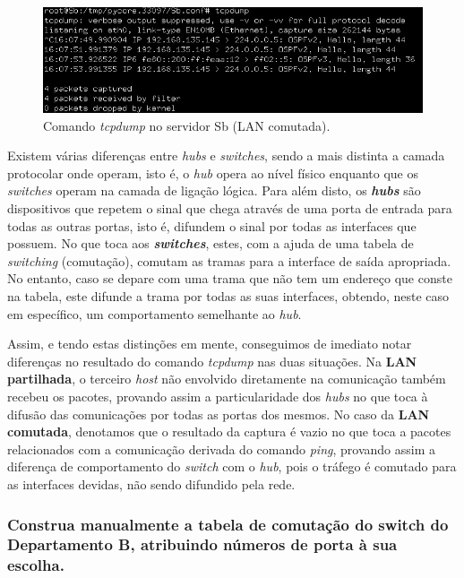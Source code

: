     \begin{figure}[H]
    \centering
    \includegraphics[width=400pt]{prints/Questao5/B-Sb.jpg}
    \caption{Comando \textit{tcpdump} no servidor Sb (LAN comutada).} \label{questao5-tcpdump-B}
    \end{figure}
    
    
    
    \par Existem várias diferenças entre \textit{hubs} e \textit{switches}, sendo a mais distinta a camada protocolar onde operam, isto é, o \textit{hub} opera ao nível físico enquanto que os \textit{switches} operam na camada de ligação lógica.
    Para além disto, os \textit{\textbf{hubs}} são dispositivos que repetem o sinal que chega através de uma porta de entrada para todas as outras portas, isto é, difundem o sinal por todas as interfaces que possuem.
    No que toca aos \textit{\textbf{switches}}, estes, com a ajuda de uma tabela de \textit{switching} (comutação), comutam as tramas para a interface de saída apropriada. No entanto, caso se depare com uma trama que não tem um endereço que conste na tabela, este difunde a trama por todas as suas interfaces, obtendo, neste caso em específico, um comportamento semelhante ao \textit{hub}.

    \par Assim, e tendo estas distinções em mente, conseguimos de imediato notar diferenças no resultado do comando \textit{tcpdump} nas duas situações. Na \textbf{LAN partilhada}, o terceiro \textit{host} não envolvido diretamente na comunicação também recebeu os pacotes, provando assim a particularidade dos \textit{hubs} no que toca à difusão das comunicações por todas as portas dos mesmos.
    No caso da \textbf{LAN comutada}, denotamos que o resultado da captura é vazio no que toca a pacotes relacionados com a comunicação derivada do comando \textit{ping}, provando assim a diferença de comportamento do \textit{switch} com o \textit{hub}, pois o tráfego é comutado para as interfaces devidas, não sendo difundido pela rede.




\subsubsection{Construa manualmente a tabela de comutação do switch do Departamento B, atribuindo números de porta à sua escolha.}

